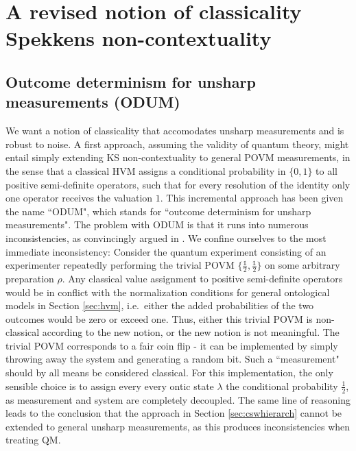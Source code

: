 \chapter[A revised notion of classicality \\ Spekkens non-contextuality]{A revised notion of classicality \\ \huge{Spekkens non-contextuality}}
\label{sec:spekkcont}
\section{Outcome determinism for unsharp measurements (ODUM)}
\label{sec:odum}
We want a notion of classicality that accomodates unsharp measurements and is robust to noise. A first approach, assuming the validity of quantum theory, might entail simply extending KS non-contextuality to general POVM measurements, in the sense that a classical HVM assigns a conditional probability in $\{0,1\}$ to all positive semi-definite operators, such that for every resolution of the identity only one operator receives the valuation $1$. This incremental approach has been given the name ``ODUM", which stands for ``outcome determinism for unsharp measurements". The problem with ODUM is that it runs into numerous inconsistencies, as convincingly argued in \cite{Spekkens2014}. We confine ourselves to the most immediate inconsistency: Consider the quantum experiment consisting of an experimenter repeatedly performing the trivial POVM $\{\frac{\mathbb{1}}{2},\frac{\mathbb{1}}{2}\}$ on some arbitrary preparation $\rho$. Any classical value assignment to positive semi-definite operators would be in conflict with the normalization conditions for general ontological models in Section \ref{sec:hvm}, i.e.\ either the added probabilities of the two outcomes would be zero or exceed one. Thus, either this trivial POVM is non-classical according to the new notion, or the new notion is not meaningful. The trivial POVM corresponds to a fair coin flip - it can be implemented by simply throwing away the system and generating a random bit. Such a ``measurement" should by all means be considered classical. For this implementation, the only sensible choice is to assign every every ontic state $\lambda$ the conditional probability $\frac{1}{2}$, as measurement and system are completely decoupled. The same line of reasoning leads to the conclusion that the approach in Section \ref{sec:cswhierarch} cannot be extended to general unsharp measurements, as this produces inconsistencies when treating QM.

